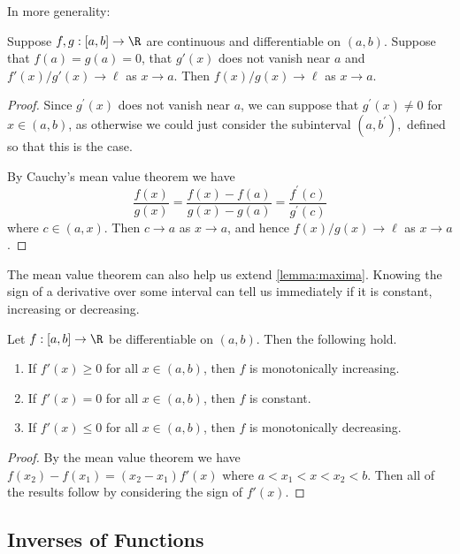 In more generality:

\begin{theorem}
	Suppose $f, g :[a, b] \rightarrow \R$ are continuous and differentiable on $(a, b)$. Suppose that $f(a) = g(a) = 0$, that $g'(x)$ does not vanish near $a$ and $f'(x)/g'(x) \rightarrow \ell$ as $x \rightarrow a$. Then $f(x)/g(x) \rightarrow \ell$ as $x \rightarrow a$.
\end{theorem}
\begin{proof}
Since $g^{\prime}(x)$ does not vanish near $a$, we can suppose that $g^{\prime}(x) \neq 0$ for $x \in(a, b)$, as otherwise we could just consider the subinterval $\left(a, b^{\prime}\right),$ defined so that this is the case.

By Cauchy's mean value theorem we have
$$
\frac{f(x)}{g(x)}=\frac{f(x)-f(a)}{g(x)-g(a)}=\frac{f^{\prime}(c)}{g^{\prime}(c)}
$$
where $c \in(a, x)$. Then $c \rightarrow a$ as $x \rightarrow a$, and hence $f(x) / g(x) \rightarrow \ell$ as $x \rightarrow a$.
\end{proof}

The mean value theorem can also help us extend \autoref{lemma:maxima}. Knowing the sign of a derivative over some interval can tell us immediately if it is constant, increasing or decreasing.

\begin{proposition}\label{prop:sign}
	Let $f: [a, b] \rightarrow \R$ be differentiable on $(a, b)$. Then the following hold.
	\begin{enumerate}[label=(\roman*)]
		\item If $f'(x) \geq 0$ for all $x \in (a, b)$, then $f$ is monotonically increasing.
		\item If $f'(x) = 0$ for all $x \in (a, b)$, then $f$ is constant.
		\item If $f'(x) \leq 0$ for all $x \in (a, b)$, then $f$ is monotonically decreasing.
	\end{enumerate}
\end{proposition}
\begin{proof}
	By the mean value theorem we have $f(x_2) - f(x_1) = (x_2 - x_1)f'(x)$ where $a < x_1 < x < x_2 < b$. Then all of the results follow by considering the sign of $f'(x)$.
\end{proof}

\subsection{Inverses of Functions}

